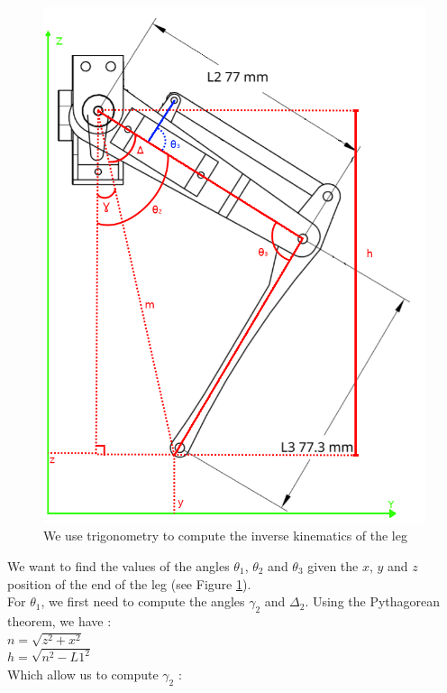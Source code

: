 \documentclass[12pt,fleqn,leqno,letterpaper]{article}
\begin{document}
\begin{figure}[h]
  \includegraphics[scale=0.35]{assets/right_annotated.png}
  \caption{We use trigonometry to compute the inverse kinematics of the leg}
  \label{schematics}
\end{figure}

We want to find the values of the angles $\theta_{1}$, $\theta_{2}$ and $\theta_{3}$ given the $x$, $y$ and $z$ position of the end of the leg (see Figure \ref{schematics}).\\

\noindent For $\theta_{1}$, we first need to compute the angles $\gamma_{2}$ and $\Delta_{2}$. Using the Pythagorean theorem, we have : \\

\noindent$ n = \sqrt{z^2 + x^2}$ \\
$h = \sqrt{n^2 - L1^2}$\\

\noindent Which allow us to compute $\gamma_{2}$ :\\
\end{document}
